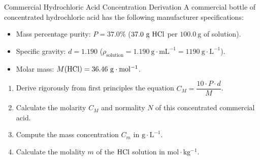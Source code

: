 \begin{exercise}{Commercial Hydrochloric Acid Concentration Derivation}
A commercial bottle of concentrated hydrochloric acid has the following manufacturer specifications:
\begin{itemize}[itemsep=1pt]
  \item Mass percentage purity: $P = 37.0\%$ ($37.0\ \mathrm{g}\ \ce{HCl}$ per $100.0\ \mathrm{g}$ of solution).
  \item Specific gravity: $d = 1.190$ ($\rho_{\text{solution}} = 1.190\ \mathrm{g\cdot mL^{-1}} = 1190\ \mathrm{g\cdot L^{-1}}$).
  \item Molar mass: $M(\ce{HCl}) = 36.46\ \mathrm{g\cdot mol^{-1}}$.
\end{itemize}
\begin{enumerate}[leftmargin=1.5em,itemsep=2pt]
  \item Derive rigorously from first principles the equation $C_M = \dfrac{10 \cdot P \cdot d}{M}$.
  \item Calculate the molarity $C_M$ and normality $N$ of this concentrated commercial acid.
  \item Compute the mass concentration $C_m$ in $\mathrm{g\cdot L^{-1}}$.
  \item Calculate the molality $m$ of the $\ce{HCl}$ solution in $\mathrm{mol\cdot kg^{-1}}$.
\end{enumerate}
\end{exercise}

\begin{tabletworkspace}[5.0cm]
\end{tabletworkspace}

